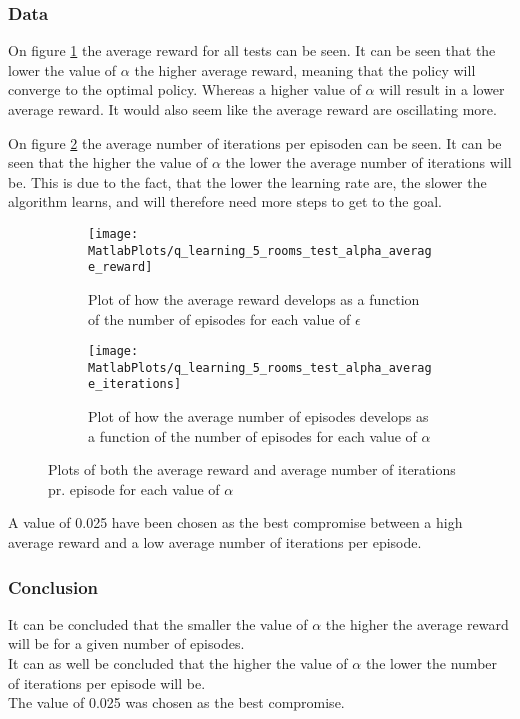 \documentclass[../Head/Main.tex]{subfiles}
\begin{document}
\clearpage
\subsubsection{Data}
On figure \ref{fig:q-learn_alpha_reward} the average reward for all tests can be seen. It can be seen that the lower the value of $\alpha$ the higher average reward, meaning that the policy will converge to the optimal policy. Whereas a higher value of $\alpha$ will result in a lower average reward. It would also seem like the average reward are oscillating more.\par
On figure \ref{fig:q-learn_alpha_iterations} the average number of iterations per episoden can be seen. It can be seen that the higher the value of $\alpha$ the lower the average number of iterations will be. This is due to the fact, that the lower the learning rate are, the slower the algorithm learns, and will therefore need more steps to get to the goal.
\begin{figure}[H]
	\centering
	\begin{subfigure}[b]{0.49\textwidth}
		\centering
		\texttt{[image: MatlabPlots/q\_learning\_5\_rooms\_test\_alpha\_average\_reward]}
		\caption{Plot of how the average reward develops as a function of the number of episodes for each value of $\epsilon$}
		\label{fig:q-learn_alpha_reward}
	\end{subfigure}
	\hfill
	\begin{subfigure}[b]{0.49\textwidth}
		\centering
		\texttt{[image: MatlabPlots/q\_learning\_5\_rooms\_test\_alpha\_average\_iterations]}
		\caption{Plot of how the average number of episodes develops as a function of the number of episodes for each value of $\alpha$}
		\label{fig:q-learn_alpha_iterations}
	\end{subfigure}
	\caption{Plots of both the average reward and average number of iterations pr. episode for each value of $\alpha$}
	\label{fig:q-learn_alpha}
\end{figure}
A value of 0.025 have been chosen as the best compromise between a high average reward and a low average number of iterations per episode.

\subsubsection{Conclusion}
It can be concluded that the smaller the value of $\alpha$ the higher the average reward will be for a given number of episodes.\\
It can as well be concluded that the higher the value of $\alpha$ the lower the number of iterations per episode will be.\\ 
The value of 0.025 was chosen as the best compromise.
\end{document}
